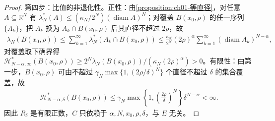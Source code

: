 \documentclass[../../main.tex]{subfiles}%
\begin{document}
\begin{proof}
第四步：比值的非退化性。正性：由\cref{proposition:ch01-等直径}，对任意 $A\subseteq\mathbb{R}^N$ 有 $\lambda_N^*(A)\leqslant(\kappa_N/2^N)(\operatorname{diam}A)^N$；对覆盖 $B(x_0,\rho)$ 的任一序列 $\{A_k\}$，把 $A_k$ 换为 $A_k\cap B(x_0,\rho)$ 后其直径不超过 $2\rho$，故
\begin{align*}
\lambda_N(B(x_0,\rho))\leqslant\sum_{k=1}^\infty\lambda_N^*(A_k\cap B(x_0,\rho))\leqslant\frac{\kappa_N}{2^N}(2\rho)^\alpha\sum_{k=1}^\infty(\operatorname{diam}A_k)^{N-\alpha},
\end{align*}
对覆盖取下确界得 $\mathcal{H}_{N-\alpha,\infty}^*(B(x_0,\rho))\geqslant2^N\lambda_N(B(x_0,\rho))/(\kappa_N(2\rho)^\alpha)>0$。有限性：由第一步，$B(x_0,\rho)$ 可由不超过 $\gamma_N\max\{1,(2\rho/\delta)^N\}$ 个直径不超过 $\delta$ 的集合覆盖，故
\begin{align*}
\mathcal{H}_{N-\alpha,\delta}^*(B(x_0,\rho))\leqslant\gamma_N\max\left\{1,\left(\frac{2\rho}{\delta}\right)^N\right\}\delta^{N-\alpha}<\infty .
\end{align*}
因此 $R_\delta$ 是有限正数，$C$ 只依赖于 $\alpha,N,x_0,\rho,\delta$，与 $E$ 无关。
\end{proof}
\end{document}

